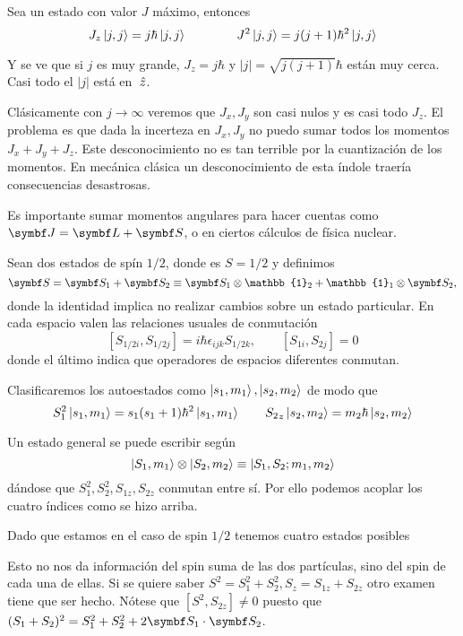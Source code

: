 \documentclass[10pt,oneside]{CBFT_book}
\begin{document}
Sea un estado con valor $J$ máximo, entonces
\[
	J_z \Ket{j,j} = j\hbar \Ket{j,j} \qquad \qquad 
	J^2 \Ket{j,j} = j (j+1) \hbar^2 \Ket{j,j}
\]

Y se ve que si $j$ es muy grande, $J_z = j\hbar$ y $|j| = \sqrt{j(j+1)} \hbar$ están muy cerca.
Casi todo el $|j|$ está en $\:\hat{z}$.


Clásicamente con $j\to\infty$ veremos que $J_x, J_y$ son casi nulos y es casi todo $J_z$.
El problema es que dada la incerteza en $J_x, J_y$ no puedo sumar todos los momentos $J_x + J_y + J_z $.
Este desconocimiento no es tan terrible por la cuantización de los momentos. En mecánica clásica un
desconocimiento de esta índole traería consecuencias desastrosas.

Es importante sumar momentos angulares para hacer cuentas como $\vb J = \vb L + \vb S$, o en ciertos 
cálculos de física nuclear.


Sean dos estados de spín $1/2$, donde es $S=1/2$ y definimos
\[
	\vb{S} = \vb{S}_1 + \vb{S}_2 \equiv 
	\vb{S}_1 \otimes \mathbb{1}_2 + \mathbb{1}_1\otimes \vb{S}_2,
\]
donde la identidad implica no realizar cambios sobre un estado particular.
En cada espacio valen las relaciones usuales de conmutación 
\[
	[ S_{1/2i},S_{1/2j}] = i\hbar\epsilon_{ijk}S_{1/2k}, \qquad  [S_{1i},S_{2j}] = 0
\]
donde el último indica que operadores de espacios diferentes conmutan.

Clasificaremos los autoestados como $\Ket{s_1,m_1}, \Ket{s_2,m_2}$ de modo que
\[
	S_1^2 \Ket{s_1,m_1} = s_1 ( s_1 + 1 ) \hbar^2 \Ket{s_1,m_1} \qquad 
	{S_2}_z \Ket{s_2,m_2} = m_2 \hbar \Ket{s_2,m_2}
\]

Un estado general se puede escribir según 
\[
	\Ket{S_1,m_1} \otimes \Ket{S_2,m_2} \equiv \Ket{S_1, S_2;m_1,m_2}
\]
dándose que $S_1^2, S_2^2, S_{1z}, S_{2z}$ conmutan entre sí. Por ello podemos acoplar los 
cuatro índices como se hizo arriba. 

Dado que estamos en el caso de spin $1/2$ tenemos cuatro estados posibles 
\be
	\Ket{++} \qquad \Ket{+-} \qquad \Ket{-+} \qquad \Ket{--}
	\label{base1}
\ee

Esto no nos da información del spin suma de las dos partículas, sino del spin de cada una 
de ellas. Si se quiere saber $S^2 = S_1^2 + S_2^2, S_z=S_{1z} + S_{2z}$ otro examen tiene que
ser hecho.
Nótese que $ [S^2, S_{2z}] \neq 0  $ puesto que $ (S_1+S_2)^2 = S_1^2 + S_2^2 + 2 \pe{S_1}{S_2}$.
\end{document}
